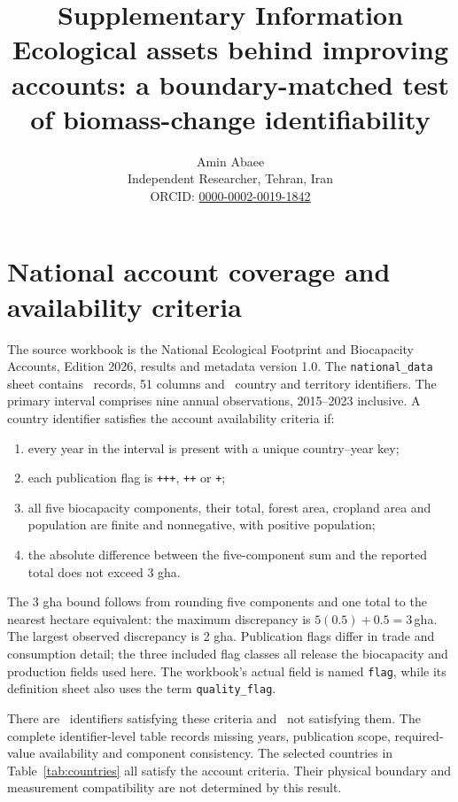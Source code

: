 \documentclass[11pt,a4paper]{article}
\title{Supplementary Information\\\large Ecological assets behind improving accounts: a boundary-matched test of biomass-change identifiability}
\author{Amin Abaee\\\small Independent Researcher, Tehran, Iran\\\small ORCID: \href{https://orcid.org/0000-0002-0019-1842}{0000-0002-0019-1842}}
\date{}
\begin{document}
\maketitle

\section{National account coverage and availability criteria}

The source workbook is the National Ecological Footprint and Biocapacity Accounts, Edition 2026, results and metadata version 1.0. The \texttt{national\_data} sheet contains \NationalRows\ records, 51 columns and \CountryIDs\ country and territory identifiers. The primary interval comprises nine annual observations, 2015--2023 inclusive. A country identifier satisfies the account availability criteria if:
\begin{enumerate}
\item every year in the interval is present with a unique country--year key;
\item each publication flag is \texttt{+++}, \texttt{++} or \texttt{+};
\item all five biocapacity components, their total, forest area, cropland area and population are finite and nonnegative, with positive population;
\item the absolute difference between the five-component sum and the reported total does not exceed 3 gha.
\end{enumerate}
The 3 gha bound follows from rounding five components and one total to the nearest hectare equivalent: the maximum discrepancy is $5(0.5)+0.5=3$\,gha. The largest observed discrepancy is 2 gha. Publication flags differ in trade and consumption detail; the three included flag classes all release the biocapacity and production fields used here. The workbook's actual field is named \texttt{flag}, while its definition sheet also uses the term \texttt{quality\_flag}.

There are \AccountPass\ identifiers satisfying these criteria and \AccountFail\ not satisfying them. The complete identifier-level table records missing years, publication scope, required-value availability and component consistency. The selected countries in Table~\ref{tab:countries} all satisfy the account criteria. Their physical boundary and measurement compatibility are not determined by this result.
\end{document}
